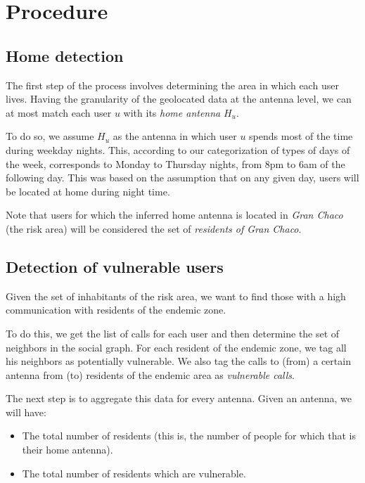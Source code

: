 
\section{Procedure}
\subsection{Home detection}

    The first step of the process involves determining the area in which each user lives. Having the granularity of the geolocated data at the antenna level, we can at most match each user $u$ with its \textit{home antenna} $H_u$.

    To do so, we assume $H_u$ as the antenna in which user $u$ spends most of the time during weekday nights. This, according to our categorization of types of days of the week, corresponds to Monday to Thursday nights, from 8pm to 6am of the following day. This was based on the assumption that on any given day, users will be located at home during night time.
    
    Note that users for which the inferred home antenna is located in \textit{Gran Chaco} (the risk area) will be considered the set of \textit{residents of Gran Chaco}.

\subsection{Detection of vulnerable users}
    Given the set of inhabitants of the risk area, we want to find those with a high communication with residents of the endemic zone.
    
    To do this, we get the list of calls for each user and then determine the set of neighbors in the social graph. For each resident of the endemic zone, we tag all his neighbors as potentially vulnerable. We also tag the calls to (from) a certain antenna from (to) residents of the endemic area as \textit{vulnerable calls}.
    
    The next step is to aggregate this data for every antenna. Given an antenna, we will have:
    \begin{itemize}
        \item The total number of residents (this is, the number of people for which that is their home antenna).
        \item The total number of residents which are vulnerable.
    \end{itemize}
    
